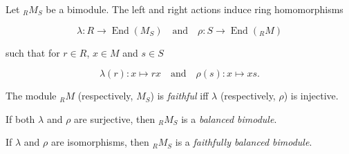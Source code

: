 Let $_R M_S$ be a bimodule. The left and right actions induce ring homomorphisms

$$\lambda: R \rightarrow \operatorname{End}(M_S) \quad \text{and} \quad \rho: S \rightarrow \operatorname{End}(_R M)$$

such that for $r \in R$, $x \in M$ and $s \in S$

$$\lambda(r): x \mapsto rx \quad \text{and} \quad \rho(s): x \mapsto xs.$$

The module $_R M$ (respectively, $M_S$) is \textit{faithful} iff $\lambda$ (respectively, $\rho$) is injective.

If both $\lambda$ and $\rho$ are surjective, then $_R M_S$ is a \textit{balanced bimodule}.

If $\lambda$ and $\rho$ are isomorphisms, then $_R M_S$ is a \textit{faithfully balanced bimodule}.
